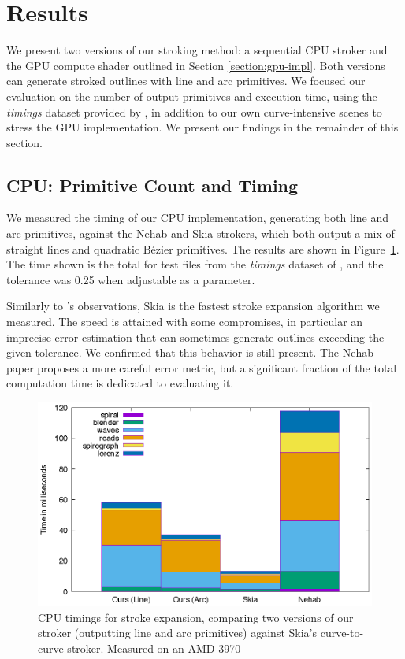 \documentclass[sigconf, nonacm]{acmart}
\begin{document}

\section{Results}


We present two versions of our stroking method: a sequential CPU stroker and the GPU compute shader outlined in Section \ref{section:gpu-impl}. Both versions can generate stroked outlines with line and arc primitives. We focused our evaluation on the number of output primitives and execution time, using the \emph{timings} dataset provided by \citet{Nehab2020}, in addition to our own curve-intensive scenes to stress the GPU implementation. We present our findings in the remainder of this section.

\subsection{CPU: Primitive Count and Timing}

We measured the timing of our CPU implementation, generating both line and arc primitives, against the Nehab and Skia strokers, which both output a mix of straight lines and quadratic Bézier primitives. The results are shown in Figure~\ref{fig:timings}. The time shown is the total for test files from the \emph{timings} dataset of \citet{Nehab2020}, and the tolerance was 0.25 when adjustable as a parameter.

Similarly to \citet{Nehab2020}'s observations, Skia is the fastest stroke expansion algorithm we measured. The speed is attained with some compromises, in particular an imprecise error estimation that can sometimes generate outlines exceeding the given tolerance. We confirmed that this behavior is still present. The Nehab paper proposes a more careful error metric, but a significant fraction of the total computation time is dedicated to evaluating it.

\begin{figure}
    \includegraphics[scale=0.6]{timings}
    \caption{CPU timings for stroke expansion, comparing two versions of our stroker (outputting line and arc primitives) against Skia's curve-to-curve stroker. Measured on an AMD 3970}
    \label{fig:timings}
\end{figure}
\end{document}
